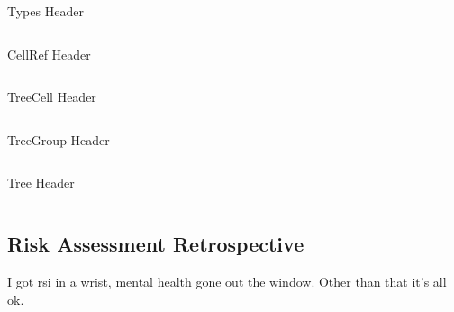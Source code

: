 \documentclass[twoside]{IIBproject}
\numberwithin{figure}{section}
\begin{document}

        \begin{listing}[ht]
            \caption{Types Header}
            \label{src:types}
            \inputminted[mathescape,fontsize=\footnotesize]{cpp}{headers/types.h}
        \end{listing}

        \begin{listing}[ht]
            \caption{CellRef Header}
            \label{src:cellref}
            \inputminted[mathescape,fontsize=\footnotesize]{cpp}{headers/cellref.h}
        \end{listing}

        \begin{listing}[ht]
            \caption{TreeCell Header}
            \label{src:treecell}
            \inputminted[mathescape,fontsize=\footnotesize]{cpp}{headers/treecell.h}
        \end{listing}

        \begin{listing}[ht]
            \caption{TreeGroup Header}
            \label{src:treegroup}
            \inputminted[mathescape,fontsize=\footnotesize]{cpp}{headers/treegroup.h}
        \end{listing}

        \begin{listing}[ht]
            \caption{Tree Header}
            \label{src:tree}
            \inputminted[mathescape,fontsize=\footnotesize]{cpp}{headers/tree.h}
        \end{listing}





    \subsection{Risk Assessment Retrospective} %
        \label{sec:appendix-ra}

        I got rsi in a wrist, mental health gone out the window. Other than that it's all ok.


\end{document}
